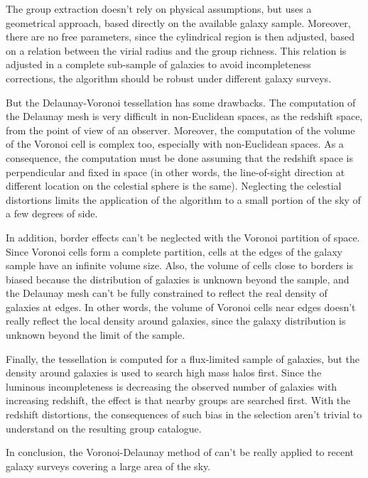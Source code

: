 The group extraction doesn't rely on physical assumptions, but uses a
geometrical approach, based directly on the available galaxy sample. Moreover,
there are no free parameters, since the cylindrical region is then adjusted,
based on a relation between the virial radius and the group richness. This
relation is adjusted in a complete sub-sample of galaxies to avoid
incompleteness corrections, the algorithm should be robust under different
galaxy surveys.

But the Delaunay-Voronoi tessellation has some drawbacks. The computation of
the Delaunay mesh is very difficult in non-Euclidean spaces, as the redshift
space, from the point of view of an observer. Moreover, the computation of the
volume of the Voronoi cell is complex too, especially with non-Euclidean
spaces. As a consequence, the computation must be done assuming that the
redshift space is perpendicular and fixed in space (in other words, the
line-of-sight direction at different location on the celestial sphere is the
same). Neglecting the celestial distortions limits the application of the
algorithm to a small portion of the sky of a few degrees of side.

In addition, border effects can't be neglected with the Voronoi partition of
space. Since Voronoi cells form a complete partition, cells at the edges of the
galaxy sample have an infinite volume size. Also, the volume of cells close to
borders is biased because the distribution of galaxies is unknown beyond the
sample, and the Delaunay mesh can't be fully constrained to reflect the real
density of galaxies at edges. In other words, the volume of Voronoi cells near
edges doesn't really reflect the local density around galaxies, since the
galaxy distribution is unknown beyond the limit of the sample.

Finally, the tessellation is computed for a flux-limited sample of galaxies,
but the density around galaxies is used to search high mass halos first. Since
the luminous incompleteness is decreasing the observed number of galaxies with
increasing redshift, the effect is that nearby groups are searched first. With
the redshift distortions, the consequences of such bias in the selection aren't
trivial to understand on the resulting group catalogue.

In conclusion, the Voronoi-Delaunay method of \citet{Marinoni+02} can't be
really applied to recent galaxy surveys covering a large area of the sky.

\subsection{\citet{Yang+07}}
\label{sub:yang07}

